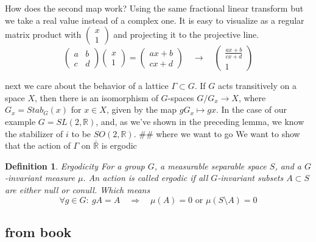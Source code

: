 \documentclass[
  12pt
]{article}
\theoremstyle{break}
\newtheorem{defn}{Definition}
\theoremstyle{plain}
\begin{document}
  How does the second map work? Using the same fractional linear transform
  but we take a real value instead of a complex one. It is easy to
  visualize as a regular matrix product with
  $\begin{pmatrix}x \\ 1\end{pmatrix}$ and projecting it to the
  projective line. \[
  \begin{pmatrix}a & b \\ c & d\end{pmatrix}\begin{pmatrix}x \\ 1\end{pmatrix} =
  \begin{pmatrix}ax + b \\ cx + d\end{pmatrix} \quad \rightarrow \quad
  \begin{pmatrix}\frac{ax + b}{cx + d} \\ 1\end{pmatrix}
  \] 

  next we care about the behavior of a lattice $\Gamma \subset G$. If
  $G$ acts transitively on a space $X$, then there is an isomorphism
  of $G$-spaces $G/G_x \rightarrow X$, where $G_x = Stab_G (x)$ for
  $x \in X$, given by the map $gG_x \mapsto gx$. In the case of our
  example $G = SL(2, \mathbb{R})$, and, as we've shown in the preceding
  lemma, we know the stabilizer of $i$ to be $SO(2,\mathbb{R})$. \#\#
  where we want to go We want to show that the action of $\Gamma$ on
  $\bar{\mathbb{R}}$ is ergodic

  \begin{defn}{Ergodicity}
  For a group $G$, a measurable separable space $S$, and a $G$-invariant measure $\mu$. An action is called ergodic if all $G$-invariant subsets $A\subset S$ are either null or conull. Which means 
  $$
  \forall g\in G:\ gA = A \quad \Rightarrow \quad \mu(A)=0 \text{ or } \mu(S\setminus A)=0
  $$
  \end{defn}

  \hypertarget{from-book}{%
  \subsection{from book}\label{from-book}}
\end{document}
